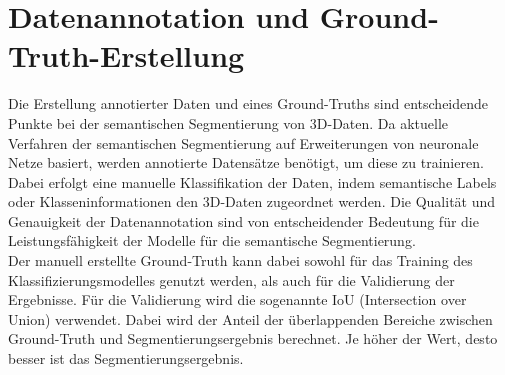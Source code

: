 \section{Datenannotation und Ground-Truth-Erstellung}

Die Erstellung annotierter Daten und eines Ground-Truths sind entscheidende
Punkte bei der semantischen Segmentierung von 3D-Daten. Da aktuelle Verfahren
der semantischen Segmentierung auf Erweiterungen von neuronale Netze basiert,
werden annotierte Datensätze benötigt, um diese zu trainieren. Dabei erfolgt
eine manuelle Klassifikation der Daten, indem semantische Labels oder
Klasseninformationen den 3D-Daten zugeordnet werden. Die Qualität und
Genauigkeit der Datenannotation sind von entscheidender Bedeutung für die
Leistungsfähigkeit der Modelle für die semantische Segmentierung.
\cite{BROSTOW200988,Zlateski_2018_CVPR}
\\Der manuell erstellte Ground-Truth kann dabei sowohl für das Training des
Klassifizierungsmodelles genutzt werden, als auch für die Validierung der
Ergebnisse. Für die Validierung wird die sogenannte IoU (Intersection over
Union) verwendet. Dabei wird der Anteil der überlappenden Bereiche zwischen
Ground-Truth und Segmentierungsergebnis berechnet. Je höher der Wert, desto
besser ist das Segmentierungsergebnis. \cite{9000872}